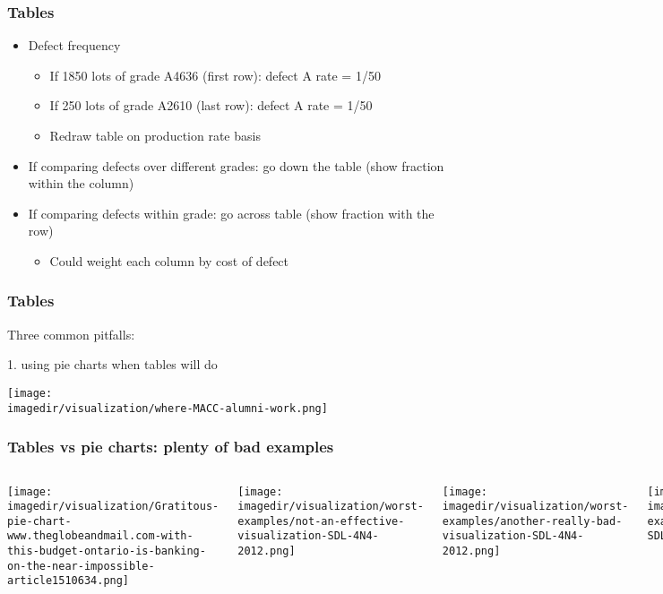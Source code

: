 \begin{frame}\frametitle{Tables}
	\begin{itemize}
		\item	Defect frequency 
		\begin{itemize}
			\item	If 1850 lots of grade A4636 (first row): defect A rate = 1/50 
			\item	If 250 lots of grade A2610 (last row): defect A rate = 1/50 
			\item	Redraw table on production rate basis 
		\end{itemize}
		\item	If comparing defects over different grades: go down the table (show fraction within the column) 
		\item	If comparing defects within grade: go across table (show fraction with the row) 
		\begin{itemize}
			\item	Could weight each column by cost of defect 
		\end{itemize}
	\end{itemize}
\end{frame}

\begin{frame}\frametitle{Tables}
	Three common pitfalls:
	
	1. using pie charts when tables will do 
	\begin{center}
		\texttt{[image: \\imagedir/visualization/where-MACC-alumni-work.png]}
	\end{center}
\end{frame}

\begin{frame}\frametitle{Tables vs pie charts: plenty of bad examples}
	\begin{columns}[t]
			\begin{center}
				\texttt{[image: \\imagedir/visualization/Gratitous-pie-chart-www.theglobeandmail.com-with-this-budget-ontario-is-banking-on-the-near-impossible-article1510634.png]}
			\end{center}
			\begin{center}
				\texttt{[image: \\imagedir/visualization/worst-examples/not-an-effective-visualization-SDL-4N4-2012.png]}
			\end{center}
			\begin{center}
				\texttt{[image: \\imagedir/visualization/worst-examples/another-really-bad-visualization-SDL-4N4-2012.png]}
			\end{center}
			\begin{center}
				\texttt{[image: \\imagedir/visualization/worst-examples/idiotic-pie-chart-SDL-4N4-2012.png]}
			\end{center}
	\end{columns}
	\vspace{12pt}
\end{frame}

